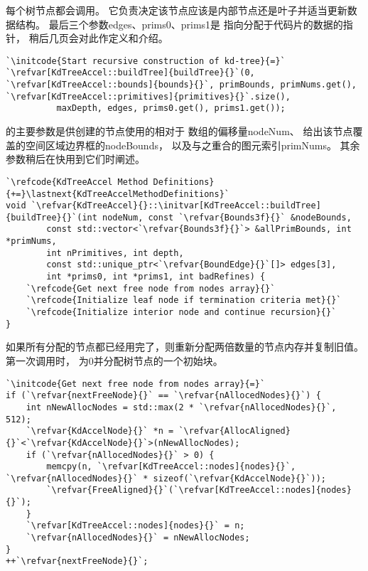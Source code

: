 每个树节点都会调用。
它负责决定该节点应该是内部节点还是叶子并适当更新数据结构。
最后三个参数{\ttfamily edges}、{\ttfamily prims0}、{\ttfamily prims1}是
指向分配于代码片的数据的指针，
稍后几页会对此作定义和介绍。
\begin{lstlisting}
`\initcode{Start recursive construction of kd-tree}{=}`
`\refvar[KdTreeAccel::buildTree]{buildTree}{}`(0, `\refvar[KdTreeAccel::bounds]{bounds}{}`, primBounds, primNums.get(), `\refvar[KdTreeAccel::primitives]{primitives}{}`.size(),
          maxDepth, edges, prims0.get(), prims1.get());
\end{lstlisting}

的主要参数是供创建的节点使用的相对于
数组的偏移量{\ttfamily nodeNum}、
给出该节点覆盖的空间区域边界框的{\ttfamily nodeBounds}，
以及与之重合的图元索引{\ttfamily primNums}。
其余参数稍后在快用到它们时阐述。
\begin{lstlisting}
`\refcode{KdTreeAccel Method Definitions}{+=}\lastnext{KdTreeAccelMethodDefinitions}`
void `\refvar{KdTreeAccel}{}::\initvar[KdTreeAccel::buildTree]{buildTree}{}`(int nodeNum, const `\refvar{Bounds3f}{}` &nodeBounds,
        const std::vector<`\refvar{Bounds3f}{}`> &allPrimBounds, int *primNums,
        int nPrimitives, int depth,
        const std::unique_ptr<`\refvar{BoundEdge}{}`[]> edges[3],
        int *prims0, int *prims1, int badRefines) {
    `\refcode{Get next free node from nodes array}{}`
    `\refcode{Initialize leaf node if termination criteria met}{}`
    `\refcode{Initialize interior node and continue recursion}{}`
}
\end{lstlisting}

如果所有分配的节点都已经用完了，则重新分配两倍数量的节点内存并复制旧值。
第一次调用时，
为0并分配树节点的一个初始块。
\begin{lstlisting}
`\initcode{Get next free node from nodes array}{=}`
if (`\refvar{nextFreeNode}{}` == `\refvar{nAllocedNodes}{}`) {
    int nNewAllocNodes = std::max(2 * `\refvar{nAllocedNodes}{}`, 512);
    `\refvar{KdAccelNode}{}` *n = `\refvar{AllocAligned}{}`<`\refvar{KdAccelNode}{}`>(nNewAllocNodes);
    if (`\refvar{nAllocedNodes}{}` > 0) {
        memcpy(n, `\refvar[KdTreeAccel::nodes]{nodes}{}`, `\refvar{nAllocedNodes}{}` * sizeof(`\refvar{KdAccelNode}{}`));
        `\refvar{FreeAligned}{}`(`\refvar[KdTreeAccel::nodes]{nodes}{}`);
    }
    `\refvar[KdTreeAccel::nodes]{nodes}{}` = n;
    `\refvar{nAllocedNodes}{}` = nNewAllocNodes;
}
++`\refvar{nextFreeNode}{}`;
\end{lstlisting}

